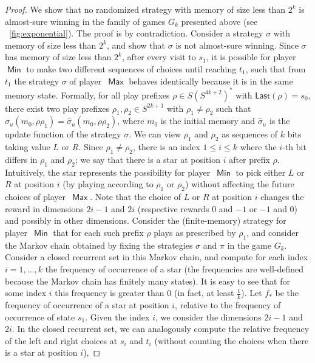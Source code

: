 \documentclass{article}
\newcommand{\Last}{\mathsf{Last}}
\newcommand{\straa}{\sigma}
\newcommand{\strab}{\pi}
\DeclareMathOperator{\ma}{\mathsf{Max}}
\DeclareMathOperator{\mi}{\mathsf{Min}}
\begin{document}
\begin{proof}
We show that no randomized strategy with memory of size less than $2^{k}$ 
is almost-sure winning in the family of games $G_k$ presented above (see \figurename~\ref{fig:exponential}). 
The proof is by contradiction. Consider a strategy $\straa$
with memory of size less than $2^{k}$, and show that $\straa$ is not 
almost-sure winning. Since $\straa$ has memory of size less than $2^{k}$,
after every visit to $s_1$, it is possible for player~$\mi$ to make two
different sequences of choices until reaching $t_1$, such that from $t_1$
the strategy $\straa$ of player~$\ma$ behaves identically because it is in the same memory state. 
Formally, for all play prefixes $\rho \in S(S^{4k+2})^*$ with $\Last(\rho) = s_0$, 
there exist two play prefixes $\rho_1, \rho_2 \in S^{2k+1}$ with $\rho_1 \neq \rho_2$
such that $\hat{\straa}_u(m_0, \rho \rho_1) = \hat{\straa}_u(m_0, \rho \rho_2)$,
where $m_0$ is the initial memory and $\hat{\straa}_u$ is the update function
of the strategy $\straa$.
We can view $\rho_1$ and $\rho_2$ as sequences of $k$ bits taking value $L$
or $R$. Since $\rho_1 \neq \rho_2$, there is an index $1 \leq i \leq k$ where
the $i$-th bit differs in $\rho_1$ and $\rho_2$; we say that there is a star at
position $i$ after prefix $\rho$. Intuitively, the star represents the possibility
for player~$\mi$ to pick either $L$ or $R$ at position $i$ (by playing according to
$\rho_1$ or $\rho_2$) without affecting the future choices of player~$\ma$.
Note that the choice of $L$ or $R$ at position $i$ changes the reward in 
dimensions $2i-1$ and $2i$ (respective rewards $0$ and $-1$ or $-1$ and $0$) and
possibly in other dimensions.
Consider the (finite-memory) strategy for player~$\mi$ that for each such 
prefix $\rho$ plays as prescribed by $\rho_1$, 
and consider the Markov chain obtained by fixing the strategies $\straa$
and $\strab$ in the game $G_k$. Consider a closed recurrent set in this Markov chain,
and compute for each index $i=1,\dots,k$ the frequency of occurrence of a star
(the frequencies are well-defined because the Markov chain has finitely many states).
It is easy to see that for some index $i$ this frequency is greater than $0$ (in fact,
at least $\frac{1}{k}$). Let $f_*$ be the frequency of occurrence of a star at 
position $i$,
relative to the frequency of occurrence of state $s_1$.
Given the index $i$, we consider the dimensions $2i -1$ and $2i$. 
In the closed recurrent set, we can analogously compute the relative frequency of the left and right
choices at $s_i$ and $t_i$ (without counting the choices when there is a star at position $i$), 

\end{proof}
\end{document}
